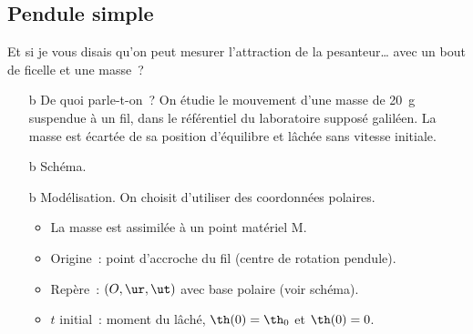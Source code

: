 \documentclass[../../main/main.tex]{subfiles}
\begin{document}
\subsection{Pendule simple}
Et si je vous disais qu'on peut mesurer l'attraction de la pesanteur… avec un
bout de ficelle et une masse~?
\bigbreak

\hspace*{-0.75cm}
\begin{minipage}{0.70\linewidth}
	\begin{enumerate}[label=\sqenumi]
		\item[b]{De quoi parle-t-on~?} On étudie le mouvement d'une masse de
		      \SI{20}{g} suspendue à un fil, dans le référentiel du laboratoire
		      supposé galiléen. La masse est écartée de sa position d'équilibre et
		      lâchée sans vitesse initiale.
		\item[b]{Schéma}.
		\item[b]{Modélisation.} On choisit d'utiliser des coordonnées polaires.
		      \begin{itemize}
			      \item La masse est assimilée à un point matériel M.
			      \item Origine~: point d'accroche du fil (centre de rotation
			            pendule).
			      \item Repère~: $(O,\ur,\ut)$ avec base polaire (voir schéma).
			      \item $t$ initial~: moment du lâché, $\th(0) = \th_0$ et
			            $\th(0) = 0$.
		      \end{itemize}
	\end{enumerate}
\end{minipage}
\hfill
\end{document}
